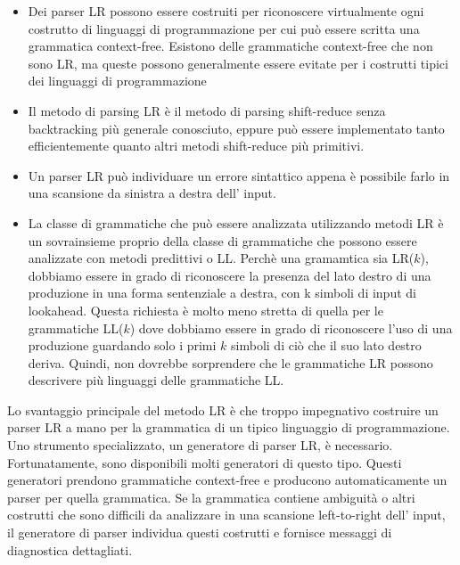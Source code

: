 \begin{itemize}
	\item Dei parser LR possono essere costruiti per riconoscere virtualmente ogni costrutto di linguaggi di programmazione per cui può essere scritta una grammatica context-free. Esistono delle grammatiche context-free che non sono LR, ma queste possono generalmente essere evitate per i costrutti tipici dei linguaggi di programmazione
	\item Il metodo di parsing LR è il metodo di parsing shift-reduce senza backtracking  più generale conosciuto, eppure può essere implementato tanto efficientemente quanto altri metodi shift-reduce più primitivi.
	\item Un parser LR può individuare un errore sintattico appena è possibile farlo in una scansione da sinistra a destra dell' input.
	\item La classe di grammatiche che può essere analizzata utilizzando metodi LR è un sovrainsieme proprio della classe di grammatiche che possono essere analizzate con metodi predittivi o LL. Perchè una gramamtica sia LR($k$), dobbiamo essere in grado di riconoscere la presenza del lato destro di una produzione in una forma sentenziale a destra, con k simboli di input di lookahead. Questa richiesta è molto meno stretta di quella per le grammatiche LL($k$) dove dobbiamo essere in grado di riconoscere l'uso di una produzione guardando solo i primi $k$ simboli di ciò che il suo lato destro deriva. Quindi, non dovrebbe sorprendere che le grammatiche LR possono descrivere più linguaggi delle grammatiche LL.
\end{itemize}
Lo svantaggio principale del metodo LR è che troppo impegnativo costruire un parser LR a mano per la grammatica di un tipico linguaggio di programmazione. Uno strumento specializzato, un generatore di parser LR, è necessario. Fortunatamente, sono disponibili molti generatori di questo tipo. Questi generatori prendono grammatiche context-free e producono automaticamente un parser per quella grammatica. Se la grammatica contiene ambiguità o altri costrutti che sono difficili da analizzare in una scansione left-to-right dell' input, il generatore di parser individua questi costrutti e fornisce messaggi di diagnostica dettagliati.

